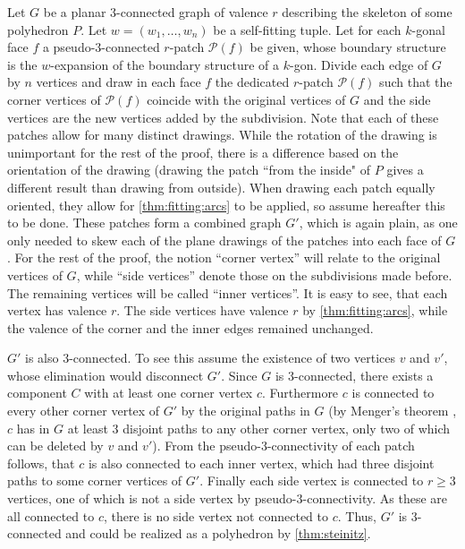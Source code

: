 \begin{construction}\label{thm:construction:patch}
  Let $G$ be a planar $3$-connected graph of valence $r$ describing the skeleton of some polyhedron $P$. Let $w = (w_1, \dots, w_n)$ be a self-fitting tuple. Let for each $k$-gonal face $f$ a pseudo-$3$-connected $r$-patch $\mathcal{P}(f)$ be given, whose boundary structure is the $w$-expansion of the boundary structure of a $k$-gon. Divide each edge of $G$ by $n$ vertices and draw in each face $f$ the dedicated $r$-patch $\mathcal{P}(f)$ such that the corner vertices of $\mathcal{P}(f)$ coincide with the original vertices of $G$ and the side vertices are the new vertices added by the subdivision. Note that each of these patches allow for many distinct drawings. While the rotation of the drawing is unimportant for the rest of the proof, there is a difference based on the orientation of the drawing (drawing the patch ``from the inside" of $P$ gives a different result than drawing from outside). When drawing each patch equally oriented, they allow for \autoref{thm:fitting:arcs} to be applied, so assume hereafter this to be done. These patches form a combined graph $G'$, which is again plain, as one only needed to skew each of the plane drawings of the patches into each face of $G$. For the rest of the proof, the notion ``corner vertex'' will relate to the original vertices of $G$, while ``side vertices'' denote those on the subdivisions made before. The remaining vertices will be called ``inner vertices''. It is easy to see, that each vertex has valence $r$. The side vertices have valence $r$ by \autoref{thm:fitting:arcs}, while the valence of the corner and the inner edges remained unchanged.

$G'$ is also $3$-connected. To see this assume the existence of two vertices $v$ and $v'$, whose elimination would disconnect $G'$. Since $G$ is $3$-connected, there exists a component $C$ with at least one corner vertex $c$. Furthermore $c$ is connected to every other corner vertex of $G'$ by the original paths in $G$ (by Menger's theorem \cite{menger}, $c$ has in $G$ at least $3$ disjoint paths to any other corner vertex, only two of which can be deleted by $v$ and $v'$). From the pseudo-$3$-connectivity of each patch follows, that $c$ is also connected to each inner vertex, which had three disjoint paths to some corner vertices of $G'$. Finally each side vertex is connected to $r \geq 3$ vertices, one of which is not a side vertex by pseudo-$3$-connectivity. As these are all connected to $c$, there is no side vertex not connected to $c$. Thus, $G'$ is $3$-connected and could be realized as a polyhedron by \autoref{thm:steinitz}.
\end{construction}

